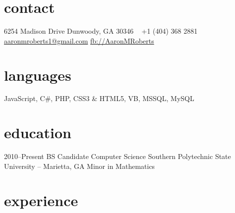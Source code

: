\documentclass[]{friggeri-cv} %
\begin{document}


\begin{aside} %
\section{contact}
6254 Madison Drive
Dunwoody, GA 30346
~
+1 (404) 368 2881
~
\href{mailto:aaronmroberts1@gmail.com}{aaronmroberts1@gmail.com}
\href{https://www.facebook.com/AaronMRoberts}{fb://AaronMRoberts}
\section{languages}
JavaScript, C\#, PHP, 
CSS3 \& HTML5, VB,
MSSQL, MySQL
\end{aside}


\section{education}

\begin{entrylist}
\entry
{2010--Present}
{BS Candidate {\normalfont Computer Science}}
{Southern Polytechnic State University -- Marietta, GA }
{Minor in Mathematics}
\end{entrylist}


\section{experience}
\end{document}
